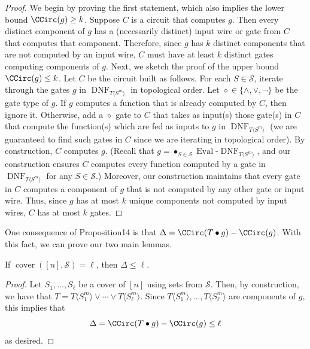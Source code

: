 \begin{proof}
We begin by proving the first statement, which also implies the lower bound $\CCirc(g)\geq k$. Suppose $C$ is a circuit that computes $g$. Then every distinct component of $g$ has a (necessarily distinct) input wire or gate from $C$ that computes that component. Therefore, since $g$ has $k$ distinct components that are not computed by an input wire, $C$ must have at least $k$ distinct gates computing components of $g$.
Next, we sketch the proof of the upper bound $\CCirc(g)\leq k$. Let $C$ be the circuit built as follows. For each $S\in\mathcal S$, iterate through the gates $g$ in $\operatorname{DNF}_{T\langle S^m\rangle}$ in topological order. Let $\diamond\in\{\land,\lor,\neg\}$ be the gate type of $g$. If $g$ computes a function that is already computed by $C$, then ignore it. Otherwise, add a $\diamond$ gate to $C$ that takes as input(s) those gate(s) in $C$ that compute the function(s) which are fed as inputs to $g$ in $\operatorname{DNF}_{T\langle S^m\rangle}$ (we are guaranteed to find such gates in $C$ since we are iterating in topological order).
By construction, $C$ computes $g$. (Recall that $g=\mathop{\bullet}_{S\in\mathcal S}\operatorname{Eval}\text{-}\operatorname{DNF}_{T\langle S^m\rangle}$, and our construction ensures $C$ computes every function computed by a gate in $\operatorname{DNF}_{T\langle S^m\rangle}$ for any $S\in\mathcal S$.) Moreover, our construction maintains that every gate in $C$ computes a component of $g$ that is not computed by any other gate or input wire. Thus, since $g$ has at most $k$ unique components not computed by input wires, $C$ has at most $k$ gates.
\end{proof}
One consequence of Proposition14 is that $\Delta=\CCirc(T\bullet g)-\CCirc(g)$. With this fact, we can prove our two main lemmas.
\begin{ntlemma}
If $\operatorname{cover}([n],\mathcal S)=\ell$, then $\Delta\leq\ell$.
\end{ntlemma}
\begin{proof}
Let $S_1,\ldots,S_\ell$ be a cover of $[n]$ using sets from $\mathcal S$. Then, by construction, we have that $T=T\langle S_1^m\rangle\lor\cdots\lor T\langle S_\ell^m\rangle$. Since $T\langle S_1^m\rangle,\ldots,T\langle S_\ell^m\rangle$ are components of $g$, this implies that
\[\Delta=\CCirc(T\bullet g)-\CCirc(g)\leq\ell\]
as desired.
\end{proof}
